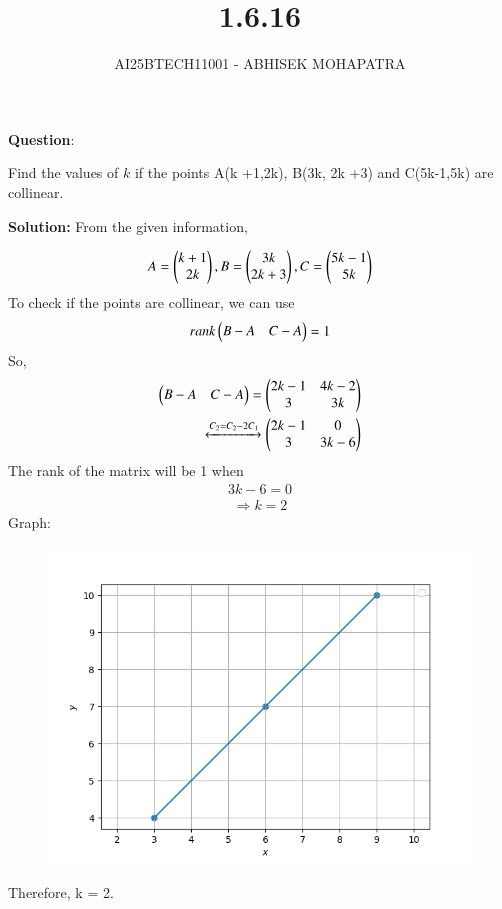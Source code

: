 \documentclass[journal]{IEEEtran}
\renewcommand{\thefigure}{\theenumi}
\renewcommand{\thetable}{\theenumi}
\numberwithin{equation}{enumi}
\numberwithin{figure}{enumi}
\renewcommand{\thetable}{\theenumi}
\begin{document}

\vspace{3cm}

\title{1.6.16}
\author{AI25BTECH11001 - ABHISEK MOHAPATRA}
{\let\newpage\relax\maketitle}
\renewcommand{\thefigure}{\theenumi}
\renewcommand{\thetable}{\theenumi}

		\textbf{Question}:

		\noindent Find the values of $k$ if the points A(k +1,2k), B(3k, 2k +3) and C(5k-1,5k) are collinear.

		\textbf{Solution:} From the given information,


		\begin{align}
			A = \begin{pmatrix}k+1\\2k\end{pmatrix},B = \begin{pmatrix}3k\\2k+3\end{pmatrix},C = \begin{pmatrix}5k-1\\5k\end{pmatrix} 
		\end{align}
		To check if the points are collinear, we can use 
		\begin{align}
			rank\begin{pmatrix}B-A & C-A\end{pmatrix} = 1	
		\end{align}
		So,
		\begin{align}
			\begin{pmatrix}B-A & C-A\end{pmatrix} = \begin{pmatrix}2k-1 & 4k-2 \\ 3 & 3k\end{pmatrix}	
			\\
			\xleftrightarrow[]{C_2 = C_2 - 2C_1} 
			\begin{pmatrix}2k-1 & 0 \\ 3 & 3k-6\end{pmatrix} 
		\end{align}
		The rank of the matrix will be 1 when 
		\begin{align}
		3k-6 = 0
		\end{align}
		\begin{align}
		\Rightarrow k = 2
		\end{align}
		Graph:
\begin{figure}[H]
	\centering
     \includegraphics{img}
	\caption*{}
	\label{img}
\end{figure}


		Therefore, k = 2.
\end{document}
